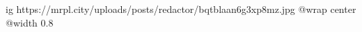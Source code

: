  
 
 
 
 

\ifcmt
  ig https://mrpl.city/uploads/posts/redactor/bqtblaan6g3xp8mz.jpg
  @wrap center
  @width 0.8
\fi
